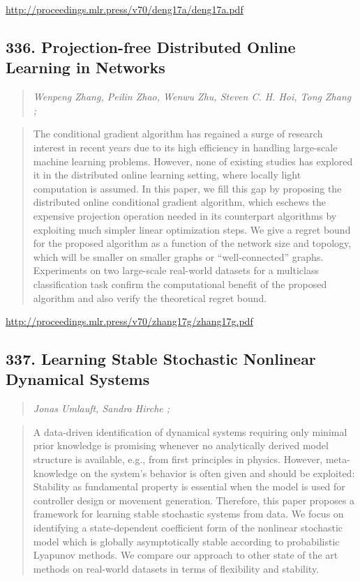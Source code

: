 \documentclass{article}
\begin{document}
\href{http://proceedings.mlr.press/v70/deng17a/deng17a.pdf}{http://proceedings.mlr.press/v70/deng17a/deng17a.pdf}

\subsection{336. Projection-free Distributed Online Learning in Networks}

\begin{quote}
\footnotesize{\textit{Wenpeng Zhang, Peilin Zhao, Wenwu Zhu, Steven C. H. Hoi, Tong Zhang ;}}
\end{quote}

\begin{quote}
    The conditional gradient algorithm has regained a surge of research interest in recent years due to its high efficiency in handling large-scale machine learning problems. However, none of existing studies has explored it in the distributed online learning setting, where locally light computation is assumed. In this paper, we fill this gap by proposing the distributed online conditional gradient algorithm, which eschews the expensive projection operation needed in its counterpart algorithms by exploiting much simpler linear optimization steps. We give a regret bound for the proposed algorithm as a function of the network size and topology, which will be smaller on smaller graphs or “well-connected” graphs. Experiments on two large-scale real-world datasets for a multiclass classification task confirm the computational benefit of the proposed algorithm and also verify the theoretical regret bound.  \end{quote}

\href{http://proceedings.mlr.press/v70/zhang17g/zhang17g.pdf}{http://proceedings.mlr.press/v70/zhang17g/zhang17g.pdf}

\subsection{337. Learning Stable Stochastic Nonlinear Dynamical Systems}

\begin{quote}
\footnotesize{\textit{Jonas Umlauft, Sandra Hirche ;}}
\end{quote}

\begin{quote}
    A data-driven identification of dynamical systems requiring only minimal prior knowledge is promising whenever no analytically derived model structure is available, e.g., from first principles in physics. However, meta-knowledge on the system’s behavior is often given and should be exploited: Stability as fundamental property is essential when the model is used for controller design or movement generation. Therefore, this paper proposes a framework for learning stable stochastic systems from data. We focus on identifying a state-dependent coefficient form of the nonlinear stochastic model which is globally asymptotically stable according to probabilistic Lyapunov methods. We compare our approach to other state of the art methods on real-world datasets in terms of flexibility and stability.  \end{quote}
\end{document}

